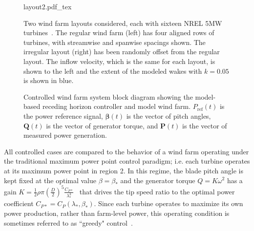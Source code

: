 \begin{figure}[t]
\centering
{layout2.pdf_tex}
\vspace{-1.5em}
\caption{Two wind farm layouts considered, each with sixteen NREL 5MW turbines~\cite{Jonkman2009a}. The regular wind farm (left) has four aligned rows of turbines, with streamwise and spanwise spacings shown. The irregular layout (right) has been randomly offset from the regular layout. The inflow velocity, which is the same for each layout, is shown to the left and the extent of the modeled wakes with $k=0.05$ is shown in blue.}
\label{fig:layout}
\end{figure}

\begin{figure}[b!]
\vspace{1em}
\begin{center}
\end{center}
\vspace{-0.5em}
\caption{\label{fig:block_diagram}Controlled wind farm system block diagram showing the model-based receding horizon controller and model wind farm. $P_\text{ref}(t)$ is the power reference signal, $\boldsymbol \beta(t)$ is the vector of pitch angles, $\mathbf{Q}(t)$ is the vector of generator torque, and $\mathbf{P}(t)$ is the vector of measured power generation.}
\end{figure}

All controlled cases are compared to the behavior of a wind farm operating under the traditional maximum power point control paradigm; i.e. each turbine operates at its maximum power point in region 2. In this regime, the blade pitch angle is kept fixed at the optimal value $\beta = \beta_*$ and the generator torque $Q = K\omega^2$ has a gain $K = \frac{1}{2}\rho \pi \left(\frac{D}{2}\right)^5 \frac{C_{P*}}{\lambda_*^3}$~\cite{Pao2011a} that drives the tip speed ratio to the optimal power coefficient \mbox{$C_{P*} = C_P(\lambda_*, \beta_*)$}. Since each turbine operates to maximize its own power production, rather than farm-level power, this operating condition is sometimes referred to as ``greedy" control~\cite{Munters2017a}.

